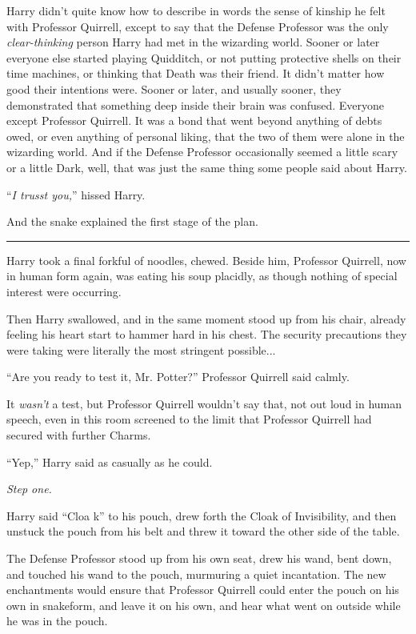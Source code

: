 Harry didn't quite know how to describe in words the sense of kinship he felt with Professor Quirrell, except to say that the Defense Professor was the only \emph{clear-thinking} person Harry had met in the wizarding world. Sooner or later everyone else started playing Quidditch, or not putting protective shells on their time machines, or thinking that Death was their friend. It didn't matter how good their intentions were. Sooner or later, and usually sooner, they demonstrated that something deep inside their brain was confused. Everyone except Professor Quirrell. It was a bond that went beyond anything of debts owed, or even anything of personal liking, that the two of them were alone in the wizarding world. And if the Defense Professor occasionally seemed a little scary or a little Dark, well, that was just the same thing some people said about Harry.

``\emph{I trusst you,}'' hissed Harry.

And the snake explained the first stage of the plan.

\begin{center}\rule{3in}{0.4pt}\end{center}

Harry took a final forkful of noodles, chewed. Beside him, Professor Quirrell, now in human form again, was eating his soup placidly, as though nothing of special interest were occurring.

Then Harry swallowed, and in the same moment stood up from his chair, already feeling his heart start to hammer hard in his chest. The security precautions they were taking were literally the most stringent possible...

``Are you ready to test it, Mr. Potter?'' Professor Quirrell said calmly.

It \emph{wasn't} a test, but Professor Quirrell wouldn't say that, not out loud in human speech, even in this room screened to the limit that Professor Quirrell had secured with further Charms.

``Yep,'' Harry said as casually as he could.

\emph{Step one.}

Harry said ``Cloa k'' to his pouch, drew forth the Cloak of Invisibility, and then unstuck the pouch from his belt and threw it toward the other side of the table.

The Defense Professor stood up from his own seat, drew his wand, bent down, and touched his wand to the pouch, murmuring a quiet incantation. The new enchantments would ensure that Professor Quirrell could enter the pouch on his own in snakeform, and leave it on his own, and hear what went on outside while he was in the pouch.

